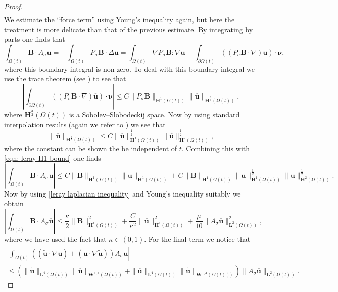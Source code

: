 \documentclass[a4paper]{amsart}
\numberwithin{equation}{section}
\newcommand{\grad}{\nabla}
\theoremstyle{plain}
\newcommand{\mbf}[1]{\mathbf{#1}}
\begin{document}
\begin{proof}
\begin{align*}
    \end{align*}
    We estimate the ``force term'' using Young's inequality again, but here the treatment is more delicate than that of the previous estimate.
    By integrating by parts one finds that
    \[\int_{\Omega(t)} \mbf{B} \cdot A_{\sigma}\overline{\mbf{u}} = - \int_{\Omega(t)} P_\sigma \mbf{B} \cdot \Delta \overline{\mbf{u}} = \int_{\Omega(t)} \grad P_\sigma \mbf{B} : \grad \overline{\mbf{u}} - \int_{\partial \Omega(t)} ((P_\sigma \mbf{B} \cdot \grad) \overline{\mbf{u}}) \cdot \boldsymbol{\nu}, \]
    where this boundary integral is non-zero.
    To deal with this boundary integral we use the trace theorem (see \cite[Chapter 7]{adams2003sobolev}) to see that
    \[ \left| \int_{\partial \Omega(t)} ((P_\sigma \mbf{B} \cdot \grad) \overline{\mbf{u}}) \cdot \boldsymbol{\nu} \right| \leq C \|P_\sigma \mbf{B}\|_{\mbf{H}^1(\Omega(t))} \|\overline{\mbf{u}} \|_{\mbf{H}^{\frac{3}{2}}(\Omega(t))}, \]
    where $\mbf{H}^{\frac{3}{2}}(\Omega(t))$ is a Sobolev--Slobodeckij space.
    Now by using standard interpolation results (again we refer to \cite[Chapter 7]{adams2003sobolev}) we see that
    \[ \|\overline{\mbf{u}} \|_{\mbf{H}^{\frac{3}{2}}(\Omega(t))} \leq C \|\overline{\mbf{u}} \|_{\mbf{H}^{1}(\Omega(t))}^{\frac{1}{2}} \|\overline{\mbf{u}} \|_{\mbf{H}^{2}(\Omega(t))}^{\frac{1}{2}}, \]
    where the constant can be shown the be independent of $t$.
    Combining this with \eqref{eqn: leray H1 bound} one finds
    \[ \left| \int_{\Omega(t)} \mbf{B} \cdot A_{\sigma}\overline{\mbf{u}} \right| \leq C \| \mbf{B} \|_{\mbf{H}^1(\Omega(t))}\|\overline{\mbf{u}} \|_{\mbf{H}^{1}(\Omega(t))} + C \| \mbf{B} \|_{\mbf{H}^1(\Omega(t))}\|\overline{\mbf{u}} \|_{\mbf{H}^{1}(\Omega(t))}^{\frac{1}{2}} \|\overline{\mbf{u}} \|_{\mbf{H}^{2}(\Omega(t))}^{\frac{1}{2}}. \]
    Now by using \eqref{leray laplacian inequality} and Young's inequality suitably we obtain
    \[ \left| \int_{\Omega(t)} \mbf{B} \cdot A_{\sigma}\overline{\mbf{u}} \right| \leq  \frac{\kappa}{2}\| \mbf{B} \|_{\mbf{H}^1(\Omega(t))}^2 + \frac{C}{\kappa^2}\|\overline{\mbf{u}} \|_{\mbf{H}^{1}(\Omega(t))}^2 + \frac{\mu}{10} \|A_{\sigma} \overline{\mbf{u}}\|_{\mbf{L}^2(\Omega(t))}^2, \]
    where we have used the fact that $\kappa \in (0,1)$.
    For the final term we notice that
    \begin{multline}
    \left| \int_{\Omega(t)} \left((\widetilde{\mbf{u}} \cdot \grad \overline{\mbf{u}}) + (\overline{\mbf{u}} \cdot \grad\widetilde{\mbf{u}}) \right)A_{\sigma} \overline{\mbf{u}} \right|\\
    \leq \left(\| \widetilde{\mbf{u}}\|_{\mbf{L}^4(\Omega(t))} \| \overline{\mbf{u}}\|_{\mbf{W}^{1,4}(\Omega(t))} + \| \overline{\mbf{u}}\|_{\mbf{L}^4(\Omega(t))} \| \widetilde{\mbf{u}}\|_{\mbf{W}^{1,4}(\Omega(t)))}\right)\| A_{\sigma}\overline{\mbf{u}} \|_{\mbf{L}^2(\Omega(t))}. \label{fsi energyestimate pf2}

\end{multline}
\end{proof}
\end{document}
